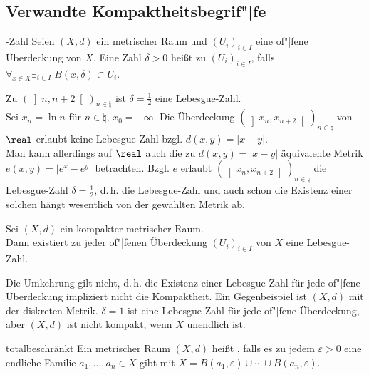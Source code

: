 \pagebreak

\subsection{%
    Verwandte Kompaktheitsbegrif"|fe%
}

\begin{Def}{-Zahl}
    Seien $(X, d)$ ein metrischer Raum und $(U_i)_{i \in I}$ eine of"|fene
    Überdeckung von $X$.
    Eine Zahl $\delta > 0$ heißt  zu
    $(U_i)_{i \in I}$, falls
    $\forall_{x \in X} \exists_{i \in I}\; B(x, \delta) \subset U_i$.
\end{Def}

\begin{Bsp}
    Zu $(\left]n, n + 2\right[)_{n \in \natural}$ ist $\delta = \frac{1}{2}$
    eine Lebesgue-Zahl. \\
    Sei $x_n = \ln n$ für $n \in \natural$, $x_0 = -\infty$.
    Die Überdeckung $(\left]x_n, x_{n+2}\right[)_{n \in \natural}$
    von $\real$ erlaubt keine Lebesgue-Zahl bzgl. $d(x, y) = |x - y|$. \\
    Man kann allerdings auf $\real$ auch die zu $d(x, y) = |x - y|$
    äquivalente Metrik $e(x, y) = |e^x - e^y|$ betrachten.
    Bzgl. $e$ erlaubt $(\left]x_n, x_{n+2}\right[)_{n \in \natural}$
    die Lebesgue-Zahl $\delta = \frac{1}{2}$, d.\,h. die Lebesgue-Zahl
    und auch schon die Existenz einer solchen hängt wesentlich von der
    gewählten Metrik ab.
\end{Bsp}

\begin{Lemma}{}
    Sei $(X, d)$ ein kompakter metrischer Raum. \\
    Dann existiert zu jeder of"|fenen Überdeckung $(U_i)_{i \in I}$
    von $X$ eine Lebesgue-Zahl.
\end{Lemma}

\begin{Bem}
    Die Umkehrung gilt nicht, d.\,h. die Existenz einer Lebesgue-Zahl
    für jede of"|fene Überdeckung impliziert nicht die Kompaktheit.
    Ein Gegenbeispiel ist $(X, d)$ mit der diskreten Metrik.
    $\delta = 1$ ist eine Lebesgue-Zahl für jede of"|fene Überdeckung,
    aber $(X, d)$ ist nicht kompakt, wenn $X$ unendlich ist.
\end{Bem}

\linie

\begin{Def}{totalbeschränkt}
    Ein metrischer Raum $(X, d)$ heißt , falls
    es zu jedem $\varepsilon > 0$ eine endliche Familie
    $a_1, \dotsc, a_n \in X$ gibt mit
    $X = B(a_1, \varepsilon) \cup \dotsb \cup B(a_n, \varepsilon)$.
\end{Def}

